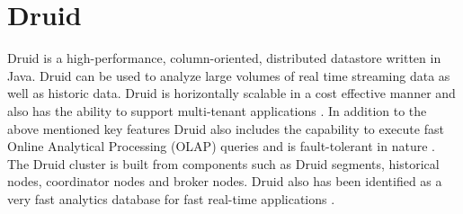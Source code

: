 \section{Druid}

Druid is a high-performance, column-oriented, distributed datastore written in Java. Druid can be used to analyze large volumes of real time streaming data as well as historic data. Druid is horizontally scalable in a cost effective manner and also has the ability to support multi-tenant applications \cite{hid-sp18-416-www-druid-wikipedia}. In addition to the above mentioned key features Druid also includes the capability to execute fast Online Analytical Processing (OLAP) queries and is fault-tolerant in nature \cite{hid-sp18-416-www-about-druid}. The Druid cluster is built from components such as Druid segments, historical nodes, coordinator nodes and broker nodes. Druid also has been identified as a very fast analytics database for fast real-time applications \cite{hid-sp18-416-www-fast-dataanalytics-druid-blog}.
